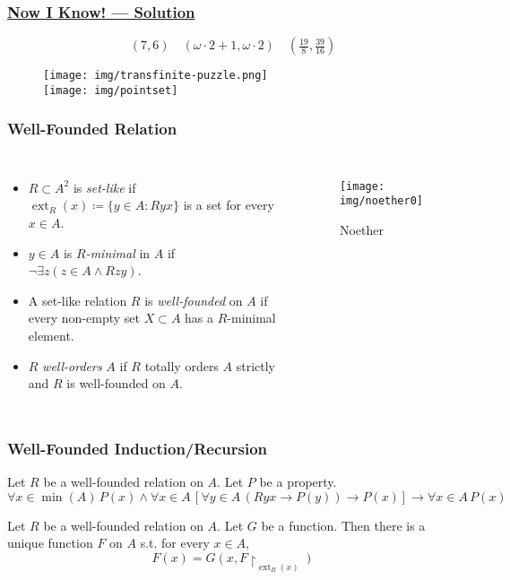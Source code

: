 \documentclass[UTF8,aspectratio=43,11pt,colorlinks,compress,openany]{beamer}%
\begin{document}
\begin{frame}\frametitle{\href{http://jdh.hamkins.org/transfinite-epistemic-logic-puzzle-challenge/}{Now I Know! --- Solution}}
\vspace{-3ex}
	\[(7,6)\quad(\omega\cdot 2+1,\omega\cdot 2)\quad(\tfrac{19}{8},\tfrac{39}{16})\]\vspace{-3ex}
	\begin{figure}
		\texttt{[image: img/transfinite-puzzle.png]}\\
		\texttt{[image: img/pointset]}
	\end{figure}
\end{frame}

\begin{frame}\frametitle{Well-Founded Relation}
\begin{columns}
\begin{itemize}
\item $R\subset A^2$ is \emph{set-like} if $\operatorname{ext}_R(x)\coloneqq \{y\in A: Ryx\}$ is a set for every $x\in A$.
\item $y\in A$ is \emph{$R$-minimal} in $A$ if $\neg\exists z(z\in A\wedge Rzy)$.
\item A set-like relation $R$ is \emph{well-founded} on $A$ if every non-empty set $X\subset A$ has a $R$-minimal element.
\item $R$ \emph{well-orders} $A$ if $R$ totally orders $A$ strictly and $R$ is well-founded on $A$.
\end{itemize}
	\begin{figure}
		\texttt{[image: img/noether0]}\caption{Noether}
	\end{figure}
\end{columns}
\end{frame}

\begin{frame}\frametitle{Well-Founded Induction/Recursion}
\begin{theorem}
Let $R$ be a well-founded relation on $A$. Let $P$ be a property.
\[\forall x\in \min(A)\,P(x)\wedge \forall x\in A\,[\forall y\in A\,(Ryx\to P(y))\to P(x)]\to \forall x\in A\,P(x)\]
\end{theorem}
\begin{theorem}
Let $R$ be a well-founded relation on $A$. Let $G$ be a function. Then there is a unique function $F$ on $A$ s.t. for every $x\in A$,
\[F(x)=G(x,F{\restriction_{\operatorname{ext}_R(x)}})\]
\end{theorem}
\end{frame}
\end{document}
